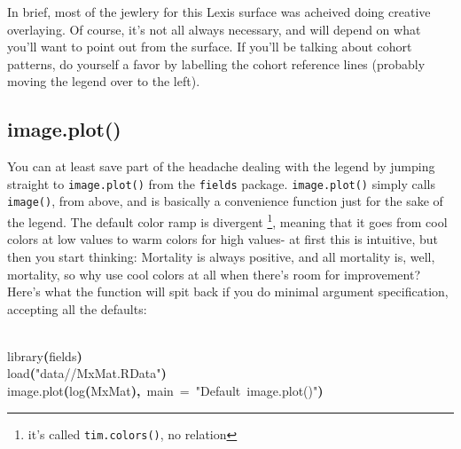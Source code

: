 \documentclass[a4paper]{article}
\newcommand{\hlfunctioncall}[1]{\textcolor[rgb]{1,0,0}{#1}}%
\newcommand{\hlstring}[1]{\textcolor[rgb]{0.6,0.6,1}{#1}}%
\newcommand{\hlkeyword}[1]{\textcolor[rgb]{0,0,0}{\textbf{#1}}}%
\newcommand{\hlargument}[1]{\textcolor[rgb]{0.694117647058824,0.247058823529412,0.0196078431372549}{#1}}%
\newcommand{\hlsymbol}[1]{\textcolor[rgb]{0,0,0}{#1}}%
\newcommand{\hlprompt}[1]{\textcolor[rgb]{0,0,0}{#1}}%
\newcommand{\hlstd}[1]{\textcolor[rgb]{0,0,0}{#1}}%
\newenvironment{Houtput}{\raggedright}{%
%
}
\begin{document}
In brief, most of the jewlery for this Lexis surface was acheived doing creative overlaying. Of course, it's not all always necessary, and will depend on what you'll want to point out from the surface. If you'll be talking about cohort patterns, do yourself a favor by labelling the cohort reference lines (probably moving the legend over to the left). 
\subsection{image.plot()}

You can at least save part of the headache dealing with the legend by jumping straight to \texttt{image.plot()} from the \texttt{fields} package. \texttt{image.plot()} simply calls \texttt{image()}, from above, and is basically a convenience function just for the sake of the legend. The default color ramp is divergent \footnote{it's called \texttt{tim.colors()}, no relation}, meaning that it goes from cool colors at low values to warm colors for high values- at first this is intuitive, but then you start thinking: Mortality is always positive, and all mortality is, well, mortality, so why use cool colors at all when there's room for improvement? Here's what the function will spit back if you do minimal argument specification, accepting all the defaults:

\begin{Houtput}
\hspace*{\fill}\\
\hlstd{}\ttfamily\noindent
\hlprompt{\usebox{\hlnormalsizeboxgreaterthan}{\ }}\hlfunctioncall{library}\hlkeyword{(}\hlsymbol{fields}\hlkeyword{)}\mbox{}
\normalfont
\hspace*{\fill}\\
\hlstd{}\ttfamily\noindent
\hlprompt{\usebox{\hlnormalsizeboxgreaterthan}{\ }}\hlfunctioncall{load}\hlkeyword{(}\hlstring{"data//MxMat.RData"}\hlkeyword{)}\mbox{}
\normalfont
\hspace*{\fill}\\
\hlstd{}\ttfamily\noindent
\hlprompt{\usebox{\hlnormalsizeboxgreaterthan}{\ }}\hlfunctioncall{image.plot}\hlkeyword{(}\hlfunctioncall{log}\hlkeyword{(}\hlsymbol{MxMat}\hlkeyword{)}\hlkeyword{,}{\ }\hlargument{main}{\ }\hlargument{=}{\ }\hlstring{"Default{\ }image.plot()"}\hlkeyword{)}\mbox{}
\normalfont
\hspace*{\fill}\\
\hlstd{}
\end{Houtput}
\end{document}
